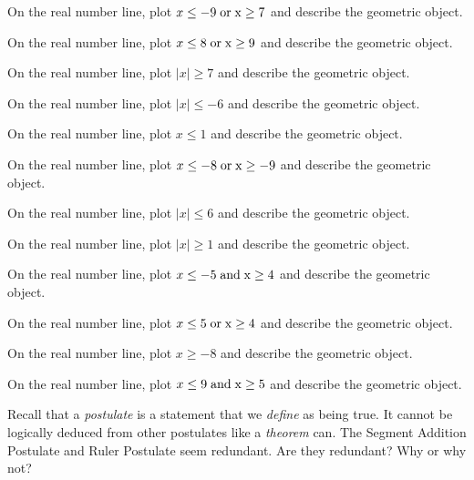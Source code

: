 \documentclass[12pt]{article}
\newenvironment{problem}[2][Problem]{\begin{trivlist}
			\item[\hskip \labelsep {\bfseries #1}\hskip \labelsep {\bfseries #2.}]}{\end{trivlist}}
\begin{document}
			\begin{problem}{0} 
On the real number line, plot $ x \leq -9 \;\rm{ or }\; x \geq 7$ and describe the geometric object.
 \end{problem}\begin{problem}{1} 
On the real number line, plot $ x \leq 8 \;\rm{ or }\; x \geq 9$ and describe the geometric object.
 \end{problem}\begin{problem}{2} 
On the real number line, plot $\mid x\mid \geq 7$ and describe the geometric object.
 \end{problem}\begin{problem}{3} 
On the real number line, plot $\mid x\mid \leq -6$ and describe the geometric object.
 \end{problem}\begin{problem}{4} 
On the real number line, plot $x \leq 1$ and describe the geometric object.
 \end{problem}\begin{problem}{5} 
On the real number line, plot $ x \leq -8 \;\rm{ or }\; x \geq -9$ and describe the geometric object.
 \end{problem}\begin{problem}{6} 
On the real number line, plot $\mid x\mid \leq 6$ and describe the geometric object.
 \end{problem}\begin{problem}{7} 
On the real number line, plot $\mid x\mid \geq 1$ and describe the geometric object.
 \end{problem}\begin{problem}{8} 
On the real number line, plot $ x \leq -5 \;\rm{ and }\; x \geq 4$ and describe the geometric object.
 \end{problem}\begin{problem}{9} 
On the real number line, plot $ x \leq 5 \;\rm{ or }\; x \geq 4$ and describe the geometric object.
 \end{problem}\begin{problem}{10} 
On the real number line, plot $x \geq -8$ and describe the geometric object.
 \end{problem}\begin{problem}{11} 
On the real number line, plot $ x \leq 9 \;\rm{ and }\; x \geq 5$ and describe the geometric object.
 \end{problem}\begin{problem}{Challenge} 

	Recall that a \textit{postulate} is a statement that we \textit{define} as being true. It cannot
	be logically deduced from other postulates like a \textit{theorem} can.
	The Segment Addition Postulate and Ruler Postulate seem redundant. Are they redundant? Why or why not?
	
 \end{problem}
\end{document}
